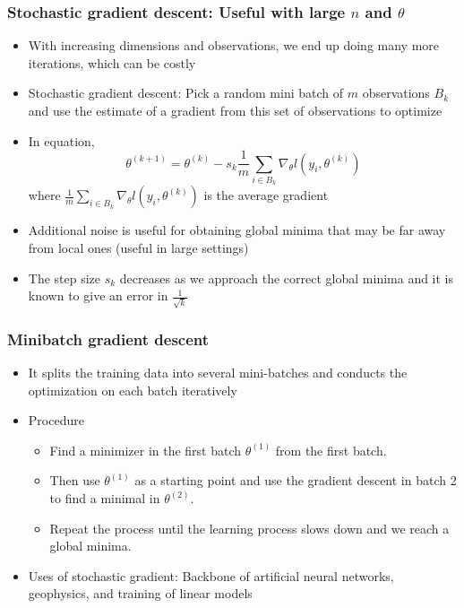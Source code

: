 \documentclass[aspectratio=169]{beamer}
\begin{document}
\begin{frame}
\frametitle{Stochastic gradient descent: Useful with large $n$ and $\theta$}
\begin{itemize}
\item With increasing dimensions and observations, we end up doing many more iterations, which can be costly
\item Stochastic gradient descent: Pick a random mini batch of $m$ observations $B_k$ and use the estimate of a gradient from this set of observations to optimize
\item In equation, 
\[
\theta^{(k+1)}= \theta^{(k)}-s_k \frac{1}{m}\sum_{i\in B_k} \nabla_\theta l (y_i, \theta^{(k)})
\]
where $\frac{1}{m}\sum_{i\in B_k} \nabla_\theta l (y_i, \theta^{(k)})$ is the average gradient
\item Additional noise is useful for obtaining global minima that may be far away from local ones (useful in large settings)
\item  The step size $s_k$ decreases as we approach the correct global minima and it is known to give an error in $\frac{1}{\sqrt{k}}$
\end{itemize}
\end{frame}

\begin{frame}
\frametitle{Minibatch gradient descent}
\begin{itemize}
\item It splits the training data into several mini-batches and conducts the optimization on each batch iteratively
\item Procedure
\begin{itemize}
\item Find a minimizer in the first batch $\theta^{(1)}$ from the first batch.
\item Then use $\theta^{(1)}$ as a starting point and use the gradient descent in batch 2 to find a minimal in $\theta^{(2)}$. 
\item Repeat the process until the learning process slows down and we reach a global minima.
\end{itemize}
\item Uses of stochastic gradient: Backbone of artificial neural networks, geophysics, and training of linear models
\end{itemize}
\end{frame}
\end{document}
